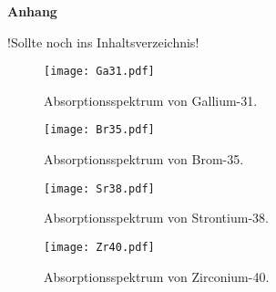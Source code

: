 \newpage

\Large\textbf{Anhang}

!Sollte noch ins Inhaltsverzeichnis!

\begin{figure}
    \centering
    \texttt{[image: Ga31.pdf]}
    \caption{Absorptionsspektrum von Gallium-31.}
    \label{fig:Ga31}
  \end{figure}
  
  \begin{figure}
    \centering
    \texttt{[image: Br35.pdf]}
    \caption{Absorptionsspektrum von Brom-35.}
    \label{fig:Br35}
  \end{figure}
  
  \begin{figure}
    \centering
    \texttt{[image: Sr38.pdf]}
    \caption{Absorptionsspektrum von Strontium-38.}
    \label{fig:Sr38}
  \end{figure}
  
  \begin{figure}
    \centering
    \texttt{[image: Zr40.pdf]}
    \caption{Absorptionsspektrum von Zirconium-40.}
    \label{fig:Zr40}
  \end{figure}
